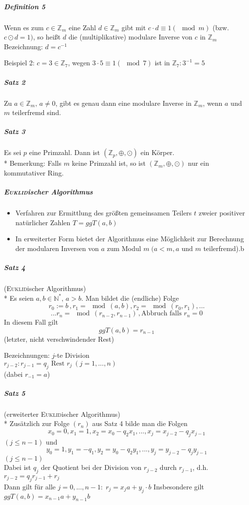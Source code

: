 \documentclass[a4paper]{scrartcl}
\begin{document}
\subparagraph{Definition 5} Wenn es zum $c \in \mathbb{Z}_m$ eine Zahl $d\in \mathbb{Z}_m$ gibt mit $c \cdot d \equiv 1 (\mod{m})$ (bzw. $ c \odot d =1)$, so heißt $d$ die (multiplikative) modulare Inverse von $c$ in $\mathbb{Z}_m$\\
Bezeichnung: $d=c^{-1}$

Beispiel 2: $c=3 \in \mathbb{Z}_7$, wegen $3 \cdot 5 \equiv 1 ( \mod{7})$ ist in $\mathbb{Z}_7: 3^{-1} = 5$

\subparagraph{Satz 2} Zu $a\in \mathbb{Z}_m,\, a\neq 0$, gibt es genau dann eine modulare Inverse in $\mathbb{Z}_m$, wenn $a$ und $m$ teilerfremd sind.

\subparagraph{Satz 3} Es sei $p$ eine Primzahl. Dann ist $(\mathbb{Z}_p,\oplus,\odot)$ ein Körper.\\*
Bemerkung: Falls $m$ keine Primzahl ist, so ist $(\mathbb{Z}_m,\oplus,\odot)$  nur ein kommutativer Ring.

\subparagraph{\textsc{Euklid}ischer Algorithmus}
\begin{itemize}
\item Verfahren zur Ermittlung des größten gemeinsamen Teilers $t$ zweier positiver natürlicher Zahlen $T=ggT(a,b)$
\item In erweiterter Form bietet der Algorithmus eine Möglichkeit zur Berechnung der modularen Inversen von $a$ zum Modul $m \; (a < m, a \text{ und } m$ teilerfremd).b
\end{itemize}

\subparagraph{Satz 4} (\textsc{Euklid}ischer Algorithmus)\\*
Es seien $a,b \in \mathbb{N}^*,\, a >b$. Man bildet die (endliche) Folge
\[ r_0 := b\, , r_1=\mod{(a,b)}, r_2=\mod{(r_0,r_1)},...\]
\[... r_n=\mod{(r_{n-2},r_{n-1})}\, ,\text{Abbruch falls } r_n=0\]
In diesem Fall gilt
\[ggT(a,b)=r_{n-1}\]
(letzter, nicht verschwindender Rest)

Bezeichnungen: $j$-te Division\\
$r_{j-2}: r_{j-1} = q_j \text{ Rest } r_j \: (j=1,...,n)$ \\
(dabei $r_{-1}=a$)

\subparagraph{Satz 5} (erweiterter \textsc{Euklid}ischer Algorithmus)\\*
Zusätzlich zur Folge $(r_n)$ aus Satz 4 bilde man die Folgen \[x_0 = 0, x_1 =1, x_2 = x_0 - q_2x_1,...,x_j=x_{j-2} - q_j x_{j-1}\]
$(j\leq n-1)$ und
\[y_0=1, y_1=-q_1,y_2=y_0-q_2y_1,...,y_j=y_{j-2}-q_jy_{j-1}\]
$(j\leq n-1)$\\
Dabei ist $q_j$ der Quotient bei der Division von $r_{j-2}$ durch $r_{j-1}$, d.h. $r_{j-2} = q_jr_{j-1} + r_j$\\
Dann gilt für alle $j=0,...,n-1: \; r_j=x_j a + y_j\cdot b$
Insbesondere gilt $ggT(a,b)=x_{n-1}a + y_{n-1}b$
\end{document}
